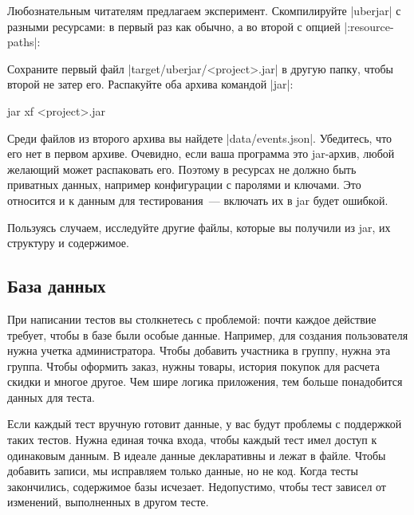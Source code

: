 Любознательным читателям предлагаем эксперимент. Скомпилируйте \spverb|uberjar|
с разными ресурсами: в первый раз как обычно, а во второй с опцией
\spverb|:resource-paths|:

\begin{english}
  \begin{clojure}
:profiles {:uberjar {:resource-paths ["env/test/resources"]}
  \end{clojure}
\end{english}

Сохраните первый файл \spverb|target/uberjar/<project>.jar| в другую папку,
чтобы второй не затер его. Распакуйте оба архива командой \spverb|jar|:

\begin{english}
  \begin{bash}
jar xf <project>.jar
  \end{bash}
\end{english}

Среди файлов из второго архива вы найдете \spverb|data/events.json|. Убедитесь,
что его нет в первом архиве. Очевидно, если ваша программа это jar-архив, любой
желающий может распаковать его. Поэтому в ресурсах не должно быть приватных
данных, например конфигурации с паролями и ключами. Это относится и к данным для
тестирования~--- включать их в jar будет ошибкой.

Пользуясь случаем, исследуйте другие файлы, которые вы получили из jar, их
структуру и содержимое.

\subsection{База данных}

При написании тестов вы столкнетесь с проблемой: почти каждое действие требует,
чтобы в базе были особые данные. Например, для создания пользователя нужна
учетка администратора. Чтобы добавить участника в группу, нужна эта
группа. Чтобы оформить заказ, нужны товары, история покупок для расчета скидки и
многое другое. Чем шире логика приложения, тем больше понадобится данных для
теста.

Если каждый тест вручную готовит данные, у вас будут проблемы с поддержкой таких
тестов. Нужна единая точка входа, чтобы каждый тест имел доступ к одинаковым
данным. В идеале данные декларативны и лежат в файле. Чтобы добавить записи, мы
исправляем только данные, но не код. Когда тесты закончились, содержимое базы
исчезает. Недопустимо, чтобы тест зависел от изменений, выполненных в другом
тесте.

